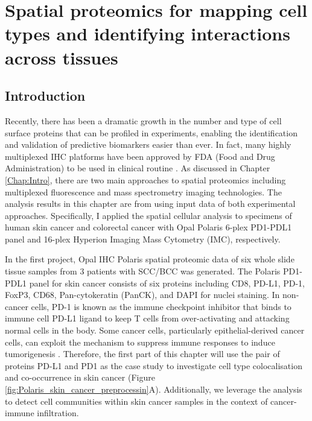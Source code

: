 \chapter[Spatial proteomics for mapping cell types and identifying interactions across tissues]{Spatial proteomics for mapping cell types and identifying interactions across tissues}
\label{Chap:3}	%
\pagestyle{headings}
\section{Introduction}
\label{Sec:3.1_intro}
Recently, there has been a dramatic growth in the number and type of cell surface proteins that can be profiled in experiments, enabling the identification and validation of predictive biomarkers easier than ever. In fact, many highly multiplexed IHC platforms have been approved by FDA (Food and Drug Administration) to be used in clinical routine \cite{van2021multiplexed, hawes2009immunohistochemistry,decalf2019new}. As discussed in Chapter \ref{Chap:Intro}, there are two main approaches to spatial proteomics including multiplexed fluorescence and mass spectrometry imaging technologies. The analysis results in this chapter are from using input data of both experimental approaches. Specifically, I applied the spatial cellular analysis to specimens of human skin cancer and colorectal cancer with Opal Polaris 6-plex PD1-PDL1 panel and 16-plex Hyperion Imaging Mass Cytometry (IMC), respectively.        

In the first project, Opal IHC Polaris spatial proteomic data of six whole slide tissue samples from 3 patients with SCC/BCC was generated. The Polaris PD1-PDL1 panel for skin cancer consists of six proteins including CD8, PD-L1, PD-1, FoxP3, CD68, Pan-cytokeratin (PanCK), and DAPI for nuclei staining. In non-cancer cells, PD-1 is known as the immune checkpoint inhibitor that binds to immune cell PD-L1 ligand to keep T cells from over-activating and attacking normal cells in the body. Some cancer cells, particularly epithelial-derived cancer cells, can exploit the mechanism to suppress immune responses to induce tumorigenesis \cite{tsai2014pd, chen2013oncology}. Therefore, the first part of this chapter will use the pair of proteins PD-L1 and PD1 as the case study to investigate cell type colocalisation and co-occurrence in skin cancer (Figure \ref{fig:Polaris_skin_cancer_preprocessin}A). Additionally, we leverage the analysis to detect cell communities within skin cancer samples in the context of cancer-immune infiltration.  

